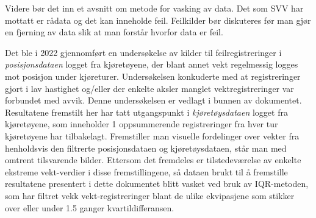 \begin{formal}
Videre bør det inn et avsnitt om metode for vasking av data. Det som SVV har mottatt er rådata og det kan inneholde feil. Feilkilder bør diskuteres før man gjør en fjerning av data slik at man forstår hvorfor data er feil.
\end{formal}
Det ble i 2022 gjennomført en undersøkelse av kilder til feilregistreringer i \textit{posisjonsdataen} logget fra kjøretøyene, der blant annet vekt regelmessig logges mot posisjon under kjøreturer.
Undersøkelsen konkuderte med at registreringer gjort i lav hastighet og/eller der enkelte aksler manglet vektregistreringer var forbundet med avvik.
Denne undersøkelsen er vedlagt i bunnen av dokumentet. 
Resultatene fremstilt her har tatt utgangspunkt i \textit{kjøretøysdataen} logget fra kjøretøyene, som inneholder 1 oppsummerende registreringer fra hver tur kjøretøyene har tilbakelagt.
Fremstiller man visuelle fordelinger over vekter fra henholdsvis den filtrerte posisjonsdataen og kjøretøysdataen, står man med omtrent tilsvarende bilder.
Ettersom det fremdeles er tilstedeværelse av enkelte ekstreme vekt-verdier i disse fremstillingene, så dataen brukt til å fremstille resultatene presentert i dette dokumentet blitt vasket ved
bruk av IQR-metoden, som har filtret vekk vekt-registreringer blant de ulike ekvipasjene som stikker over eller under 1.5 ganger kvartildifferansen.
